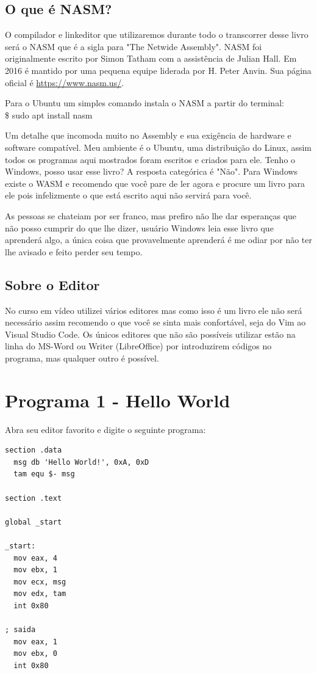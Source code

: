 \subsection{O que é NASM?}

O compilador e linkeditor que utilizaremos durante todo o transcorrer desse livro será o NASM que é a sigla para "The Netwide Assembly". NASM foi originalmente escrito por Simon Tatham com a assistência de Julian Hall. Em 2016 é mantido por uma pequena equipe liderada por H. Peter Anvin. Sua página oficial é \url{https://www.nasm.us/}.

Para o Ubuntu um simples comando instala o NASM a partir do terminal:\\
{\ttfamily\$ sudo apt install nasm}
\\[2mm]
\begin{dica}
	Um detalhe que incomoda muito no Assembly e sua exigência de hardware e software compatível. Meu ambiente é o Ubuntu, uma distribuição do Linux, assim todos os programas aqui mostrados foram escritos e criados para ele. Tenho o Windows, posso usar esse livro? A resposta categórica é "Não". Para Windows existe o WASM e recomendo que você pare de ler agora e procure um livro para ele pois infelizmente o que está escrito aqui não servirá para você.
\end{dica}

As pessoas se chateiam por ser franco, mas prefiro não lhe dar esperanças que não posso cumprir do que lhe dizer, usuário Windows leia esse livro que aprenderá algo, a única coisa que provavelmente aprenderá é me odiar por não ter lhe avisado e feito perder seu tempo.

\subsection{Sobre o Editor}

No curso em vídeo utilizei vários editores mas como isso é um livro ele não será necessário assim recomendo o que você se sinta mais confortável, seja do Vim ao Visual Studio Code. Os únicos editores que não são possíveis utilizar estão na linha do MS-Word ou Writer (LibreOffice) por introduzirem códigos no programa, mas qualquer outro é possível.

\section{Programa 1 - Hello World}
Abra seu editor favorito e digite o seguinte programa:
\begin{lstlisting}[]
section .data
  msg db 'Hello World!', 0xA, 0xD
  tam equ $- msg

section .text

global _start

_start:
  mov eax, 4
  mov ebx, 1
  mov ecx, msg
  mov edx, tam
  int 0x80

; saida
  mov eax, 1
  mov ebx, 0
  int 0x80
\end{lstlisting}

